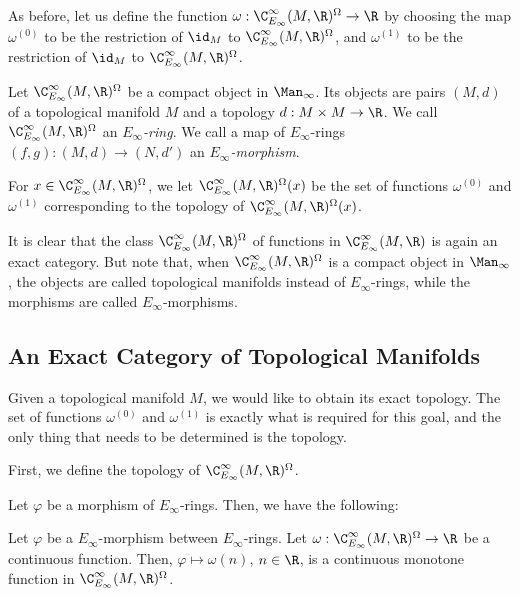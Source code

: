 \documentclass[a4paper,reqno,oneside]{article}
\begin{document}
As before, let us define the function $\omega: \C^{\infty}_{E_\infty}(M, \R)^{\Omega} \to \R$ by choosing the map $\omega^{(0)}$ to be the restriction of $\id_M$ to $\C^{\infty}_{E_\infty}(M, \R)^{\Omega}$, and $\omega^{(1)}$ to be the restriction of $\id_M$ to $\C^{\infty}_{E_\infty}(M, \R)^{\Omega}$. 

\begin{definition}
    Let $\C^{\infty}_{E_\infty}(M, \R)^{\Omega}$ be a compact object in $\Man_{\infty}$. Its objects are pairs $(M, d)$ of a topological manifold $M$ and a topology $d: M \times M \to \R$. We call $\C^{\infty}_{E_\infty}(M, \R)^{\Omega}$ an \emph{$E_\infty$-ring}. We call a map of $E_\infty$-rings $(f,g) : (M, d) \to (N, d')$ an \emph{$E_\infty$-morphism}.
\end{definition}

For $x \in \C^{\infty}_{E_\infty}(M, \R)^{\Omega}$, we let $\C^{\infty}_{E_\infty}(M, \R)^{\Omega}(x)$ be the set of functions $\omega^{(0)}$ and $\omega^{(1)}$ corresponding to the topology of $\C^{\infty}_{E_\infty}(M, \R)^{\Omega}(x)$.

\begin{remark}\label{rem:exact_category}
    It is clear that the class $\C^{\infty}_{E_\infty}(M, \R)^{\Omega}$ of functions in $\C^{\infty}_{E_\infty}(M, \R)$ is again an exact category. But note that, when $\C^{\infty}_{E_\infty}(M, \R)^{\Omega}$ is a compact object in $\Man_{\infty}$, the objects are called topological manifolds instead of $E_\infty$-rings, while the morphisms are called $E_\infty$-morphisms.
\end{remark}

\subsection{An Exact Category of Topological Manifolds}

Given a topological manifold $M$, we would like to obtain its exact topology. The set of functions $\omega^{(0)}$ and $\omega^{(1)}$ is exactly what is required for this goal, and the only thing that needs to be determined is the topology.

First, we define the topology of $\C^{\infty}_{E_\infty}(M, \R)^{\Omega}$.

Let $\varphi$ be a morphism of $E_\infty$-rings. Then, we have the following:

\begin{proposition}\label{prop:subspace_exact_topology}
    Let $\varphi$ be a $E_\infty$-morphism between $E_\infty$-rings. Let $\omega: \C^{\infty}_{E_\infty}(M, \R)^{\Omega} \to \R$ be a continuous function. Then, $\varphi \mapsto \omega(n)$, $n \in \R$, is a continuous monotone function in $\C^{\infty}_{E_\infty}(M, \R)^{\Omega}$.
\end{proposition}
\end{document}
